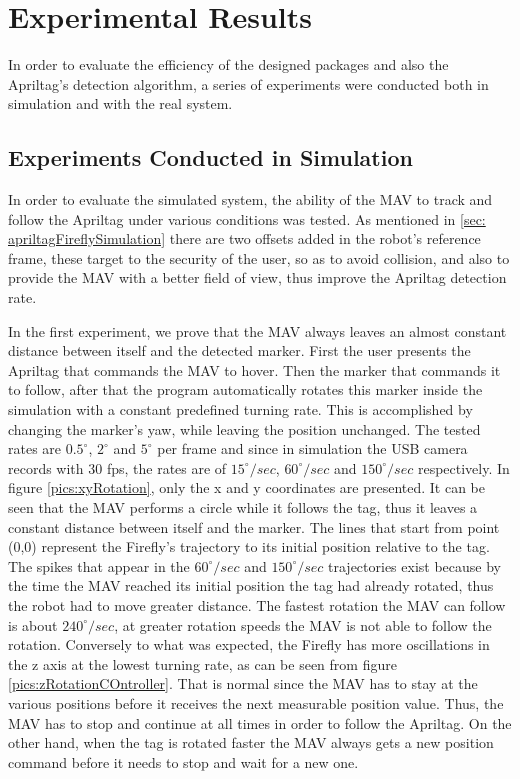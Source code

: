 \chapter{Experimental Results}
\label{sec:ExperimentalResults}

In order to evaluate the efficiency of the designed packages and also the Apriltag's detection algorithm, a series of experiments were conducted both in simulation and with the real system.

\section{Experiments Conducted in Simulation}
\label{sec:simulatedExperiments}

In order to evaluate the simulated system, the ability of the MAV to track and follow the Apriltag under various conditions was tested. As mentioned in \ref{sec: apriltagFireflySimulation} there are two offsets added in the robot's reference frame, these target to the security of the user, so as to avoid collision, and also to provide the MAV with a better field of view, thus improve the Apriltag detection rate.   

In the first experiment, we prove that the MAV always leaves an almost constant distance between itself and the detected marker. First the user presents the Apriltag that commands the MAV to hover. Then the marker that commands it to follow, after that the program automatically rotates this marker inside the simulation with a constant predefined turning rate. This is accomplished by changing the marker's yaw, while leaving the position unchanged. The tested rates are $0.5^{\circ}$, $2^{\circ}$ and $5^{\circ}$ per frame and since in simulation the USB camera records with 30 fps, the rates are of $15^{\circ}/sec$, $60^{\circ}/sec$ and $150^{\circ}/sec$ respectively. In figure \ref{pics:xyRotation}, only the x and y coordinates are presented. It can be seen that the MAV performs a circle while it follows the tag, thus it leaves a constant distance between itself and the marker. The lines that start from point (0,0) represent the Firefly's trajectory to its initial position relative to the tag. The spikes that appear in the $60^{\circ}/sec$ and $150^{\circ}/sec$ trajectories exist because by the time the MAV reached its initial position the tag had already rotated, thus the robot had to move greater distance. The fastest rotation the MAV can follow is about $240^{\circ}/sec$, at greater rotation speeds the MAV is not able to follow the rotation. Conversely to what was expected, the Firefly has more oscillations in the z axis at the lowest turning rate, as can be seen from figure \ref{pics:zRotationCOntroller}. That is normal since the MAV has to stay at the various positions before it receives the next measurable position value. Thus, the MAV has to stop and continue at all times in order to follow the Apriltag. On the other hand, when the tag is rotated faster the MAV always gets a new position command before it needs to stop and wait for a new one.

